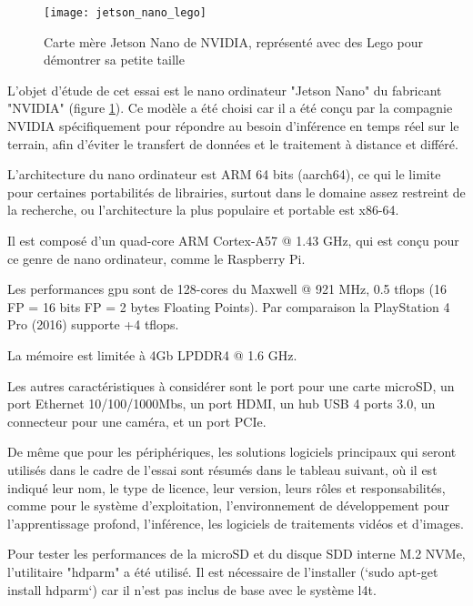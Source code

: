 ﻿
\begin{figure}[H]
    \centering
    \texttt{[image: jetson\_nano\_lego]}
    \caption[Carte mère Jetson Nano de NVIDIA]{Carte mère Jetson Nano de NVIDIA, représenté avec des Lego pour démontrer sa petite taille}
    \label{fig:jetson_nano_lego}
\end{figure}
\par L'objet d'étude de cet essai est le nano ordinateur "Jetson Nano" du fabricant "NVIDIA" (figure \ref{fig:jetson_nano_lego}). Ce modèle a été choisi car il a été conçu par la compagnie NVIDIA spécifiquement pour répondre au besoin d'inférence en temps réel sur le terrain, afin d'éviter le transfert de données et le traitement à distance et différé. 
\par L'architecture du nano ordinateur est ARM 64 bits (aarch64), ce qui le limite pour certaines portabilités de librairies, surtout dans le domaine assez restreint de la recherche, ou l'architecture la plus populaire et portable est x86-64. 
\par Il est composé d'un quad-core ARM Cortex-A57 @ 1.43 GHz, qui est conçu pour ce genre de nano ordinateur, comme le Raspberry Pi.
\par Les performances \acrshort{gpu} sont de 128-cores du Maxwell @ 921 MHz, 0.5 \acrshort{tflops} (16 FP = 16 bits FP = 2 bytes Floating Points). Par comparaison la PlayStation 4 Pro (2016) supporte +4 \acrshort{tflops}. 
\par La mémoire est limitée à 4Gb LPDDR4 @ 1.6 GHz.
\par Les autres caractéristiques à considérer sont le port pour une carte microSD, un port Ethernet 10/100/1000Mbs, un port HDMI, un hub USB 4 ports 3.0, un connecteur pour une caméra, et un port PCIe.
\par De même que pour les périphériques, les solutions logiciels principaux qui seront utilisés dans le cadre de l'essai sont résumés dans le tableau suivant, où il est indiqué leur nom, le type de licence, leur version, leurs rôles et responsabilités, comme pour le système d'exploitation, l'environnement de développement pour l'apprentissage profond, l'inférence, les logiciels de traitements vidéos et d'images. 
\par Pour tester les performances de la microSD et du disque SDD interne M.2 NVMe, l'utilitaire "hdparm" a été utilisé. Il est nécessaire de l'installer (`sudo apt-get install hdparm`) car il n'est pas inclus de base avec le système \acrshort{l4t}.
